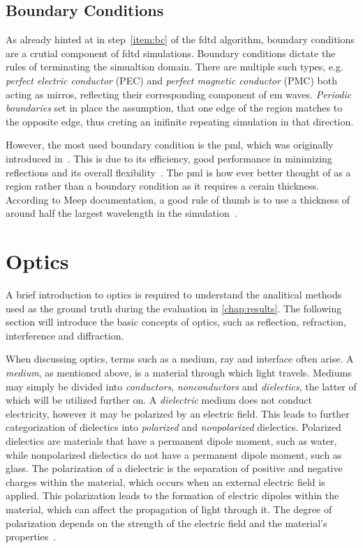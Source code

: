 \subsection{Boundary Conditions}
As already hinted at in step~\ref{item:bc} of the \gls{fdtd} algorithm, boundary conditions are a crutial component of \gls{fdtd} simulations. Boundary conditions dictate the rules of terminating the simualtion domain. There are multiple such types, e.g. \emph{perfect electric conductor} (PEC) and \emph{perfect magnetic conductor} (PMC) both acting as mirros, reflecting their corresponding component of \gls{em} waves. \emph{Periodic boundaries} set in place the assumption, that one edge of the region matches to the opposite edge, thus creting an inifinite repeating simulation in that direction.

However, the most used boundary condition is the \gls{pml}, which was originally introduced in~\cite{BERENGER1994185}. This is due to its efficiency, good performance in minimizing reflections and its overall flexibility~\cite{Teixeira2023}. The \gls{pml} is how ever better thought of as a region rather than a boundary condition as it requires a cerain thickness. According to Meep documentation, a good rule of thumb is to use a thickness of around half the largest wavelength in the simulation~\cite{meep_pml_ruleofthumb}.

\section{Optics}\label{sec:optics}
A brief introduction to optics is required to understand the analitical methods used as the ground truth during the evaluation in \cref{chap:results}. The following section will introduce the basic concepts of optics, such as reflection, refraction, interference and diffraction.

When discussing optics, terms such as a medium, ray and interface often arise. A \emph{medium}, as mentioned above, is a material through which light travels. Mediums may simply be divided into \emph{conductors}, \emph{nonconductors} and \emph{dielectics}, the latter of which will be utilized further on. A \emph{dielectric} medium does not conduct electricity, however it may be polarized by an electric field. This leads to further categorization of dielectics into \emph{polarized} and \emph{nonpolarized} dielectics. Polarized dielectics are materials that have a permanent dipole moment, such as water, while nonpolarized dielectics do not have a permanent dipole moment, such as glass. The polarization of a dielectric is the separation of positive and negative charges within the material, which occurs when an external electric field is applied. This polarization leads to the formation of electric dipoles within the material, which can affect the propagation of light through it. The degree of polarization depends on the strength of the electric field and the material's properties~\cite[Chapter~6]{cermak}.

